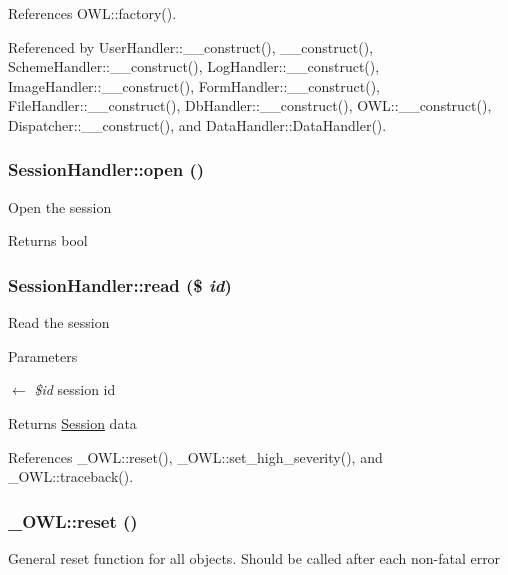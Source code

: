 References OWL::factory().



Referenced by UserHandler::\_\-\_\-construct(), \_\-\_\-construct(), SchemeHandler::\_\-\_\-construct(), LogHandler::\_\-\_\-construct(), ImageHandler::\_\-\_\-construct(), FormHandler::\_\-\_\-construct(), FileHandler::\_\-\_\-construct(), DbHandler::\_\-\_\-construct(), OWL::\_\-\_\-construct(), Dispatcher::\_\-\_\-construct(), and DataHandler::DataHandler().

\subsubsection[{open}]{\setlength{\rightskip}{0pt plus 5cm}SessionHandler::open ()}\label{classSessionHandler_a50aa0b123f53d99de350a0eb02b4bfa5}
Open the session

\begin{DoxyReturn}{Returns}
bool 
\end{DoxyReturn}
\subsubsection[{read}]{\setlength{\rightskip}{0pt plus 5cm}SessionHandler::read (\$ {\em id})}\label{classSessionHandler_a58cc3e5bf5b14e7bfbc73162de1f5d2b}
Read the session


\begin{DoxyParams}{Parameters}
\item[\mbox{$\leftarrow$} {\em \$id}]session id \end{DoxyParams}
\begin{DoxyReturn}{Returns}
\hyperlink{classSession}{Session} data 
\end{DoxyReturn}


References \_\-OWL::reset(), \_\-OWL::set\_\-high\_\-severity(), and \_\-OWL::traceback().

\subsubsection[{reset}]{\setlength{\rightskip}{0pt plus 5cm}\_\-OWL::reset ()}\label{class__OWL_a2f2a042bcf31965194c03033df0edc9b}
General reset function for all objects. Should be called after each non-\/fatal error 

